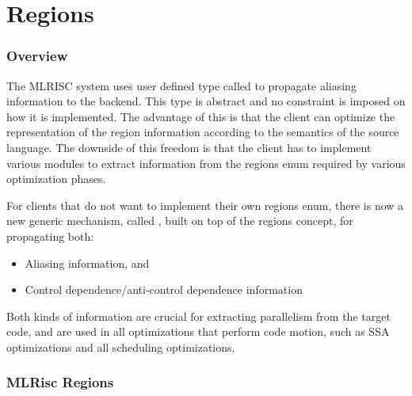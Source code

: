 \section{Regions}
\subsubsection{Overview}

The MLRISC system uses user defined type called
 to propagate
aliasing information to the backend. This type is
abstract and no constraint is imposed on how it is implemented.
The advantage of this is that the client can optimize the representation
of the region information according to the semantics of the source language.
The downside of this freedom is that the client has to implement
various modules to extract information from the regions enum
required by various optimization phases.

For clients that do not want to implement their own regions enum,
there is now a new generic mechanism, called 
, built on top of
the regions concept, for propagating both:
\begin{itemize}
  \item Aliasing information, and
  \item Control dependence/anti-control dependence information
\end{itemize}
Both kinds of information are crucial for extracting parallelism
from the target code, and are used in all optimizations that perform code
motion, such as SSA optimizations and all scheduling optimizations. 

\subsubsection{MLRisc Regions}
